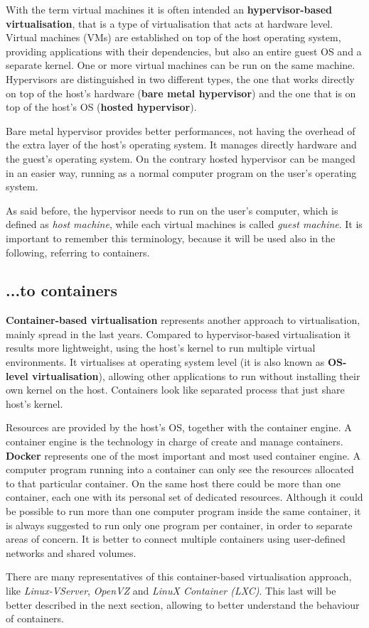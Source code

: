 \documentclass[a4paper,12pt]{article}
\begin{document}
With the term virtual machines it is often intended an \textbf{hypervisor-based
virtualisation}, that is a type of virtualisation that acts at hardware level.
Virtual machines (VMs) are established on top of the host operating system,
providing applications with their dependencies, but also an entire guest OS and
a separate kernel. One or more virtual machines can be run on the same machine.
Hypervisors are distinguished in two different types, the one that works
directly on top of the host's hardware (\textbf{bare metal hypervisor}) and the
one that is on top of the host's OS (\textbf{hosted hypervisor}). \par Bare
metal hypervisor provides better performances, not having the overhead of the
extra layer of the host's operating system. It manages directly hardware and the
guest's operating system. On the contrary hosted hypervisor can be manged in an
easier way, running as a normal computer program on the user's operating system.
\par As said before, the hypervisor needs to run on the user's computer, which
is defined as \textit{host machine}, while each virtual machines is called
\textit{guest machine}. It is important to remember this terminology, because it
will be used also in the following, referring to containers. 


\subsection{...to containers}

\textbf{Container-based virtualisation} represents another approach to
virtualisation, mainly spread in the last years. Compared to hypervisor-based
virtualisation it results more lightweight, using the host's kernel to run
multiple virtual environments. It virtualises at operating system level (it is
also known as \textbf{OS-level virtualisation}), allowing other applications to
run without installing their own kernel on the host. Containers look like
separated process that just share host's kernel. \par Resources are provided by
the host's OS, together with the container engine. A container engine is the
technology in charge of create and manage containers. \textbf{Docker} represents
one of the most important and most used container engine. A computer program
running into a container can only see the resources allocated to that particular
container. On the same host there could be more than one container, each one
with its personal set of dedicated resources. Although it could be possible to
run more than one computer program inside the same container, it is always
suggested to run only one program per container, in order to separate areas of
concern. It is better to connect multiple containers using user-defined networks
and shared volumes. \par There are many representatives of this container-based
virtualisation approach, like \textit{Linux-VServer}, \textit{OpenVZ} and
\textit{LinuX Container (LXC)}. This last will be better described in the next
section, allowing to better understand the behaviour of containers. 
\end{document}

